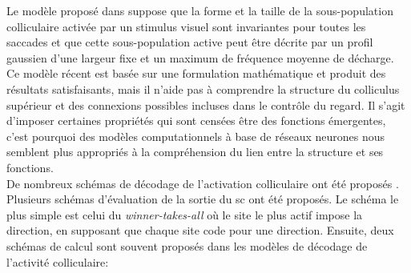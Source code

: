Le modèle proposé dans \cite{VanOpstal:2008} suppose que la forme et la taille de la sous-population colliculaire activée par un stimulus visuel sont invariantes pour toutes les saccades et que cette sous-population active peut être décrite par un profil gaussien d'une largeur fixe et un maximum de fréquence moyenne de décharge. Ce modèle récent est basée sur une formulation mathématique et produit des résultats satisfaisants, mais il n'aide pas à comprendre la structure du colliculus supérieur et des connexions possibles incluses dans le contrôle du regard. Il s'agit d'imposer certaines propriétés qui sont censées être des fonctions émergentes, c'est pourquoi des modèles computationnels à base de réseaux neurones nous semblent plus appropriés à la compréhension du lien entre la structure et ses fonctions.\\

De nombreux schémas de décodage de l'activation colliculaire ont été proposés \cite {McIlwain:1976, Sparks:1976, Massonne:1994, Badler:2002, Lee:1988, Bozis:1998}. Plusieurs schémas d'évaluation de la sortie du \gls{sc} ont été proposés. Le schéma le plus simple est celui du \textit{winner-takes-all} où le site le plus actif impose la direction, en supposant que chaque site code pour une direction. Ensuite, deux schémas de calcul sont souvent proposés dans les modèles de décodage de l'activité colliculaire:\\

